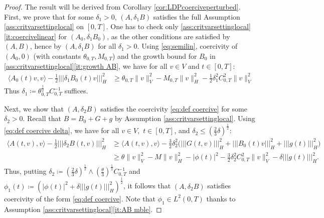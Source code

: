 \documentclass{amsart}
\newcommand{\<}{\langle}
\newcommand{\?}{\rangle}
\newcommand{\nn}{|\!|\!|}
\newcommand{\ceqq}{\coloneqq}
\theoremstyle{plain}
\theoremstyle{remark}
\theoremstyle{plain}
\numberwithin{equation}{section}
\begin{document}
\begin{proof} 
The result will be derived from Corollary \ref{cor:LDPcoerciveperturbed}. 
First, we prove that for some $\delta_1>0$, $(A,\delta_1 B)$ satisfies the full Assumption \ref{ass:critvarsettinglocal} on $[0,T]$. One has to check only \ref{ass:critvarsettinglocal}\ref{it:coercivelinear} for $(A_0,\delta_1 B_0)$, as the other conditions are satisfied by $(A,B)$, hence by $(A,\delta_1 B)$ for all $\delta_1>0$. Using \eqref{eq:semilin}, coercivity of $(A_0,0)$ (with constants $\theta_{0,T},M_{0,T}$) and the growth bound for $B_0$ in \ref{ass:critvarsettinglocal}\ref{it:growth AB}, we have for all $v\in V$ and $t\in[0,T]$:  
\begin{align*} 
\<A_0(t)v,v\?-\tfrac{1}{2}\nn \delta_1 B_0(t)v\nn_H^2 
&\geq  \theta_{0,T} \|v\|_V^2-M_{0,T} \|v\|_H^2-\tfrac{1}{2}\delta_1^2C_{0,T}^2\|v\|_V^2 
\end{align*} 
Thus $\delta_1\ceqq  \theta_{0,T}^{\frac12}C_{0,T}^{-1}$ suffices. 
  
Next, we show that $(A,\delta_2 B)$ satisfies the coercivity \eqref{eq:def coercive} for some $\delta_2>0$. Recall that $B=B_0+G+g$ by Assumption \ref{ass:critvarsettinglocal}. Using \eqref{eq:def coercive delta}, we have for all $v\in V,$ $t\in[0,T]$, and $\delta_2\leq (\frac23\delta)^{\frac12}$:
\begin{align*} 
   \<A(t,v),v\?-\tfrac{1}{2}\nn \delta_2 B (t,v) \nn_H^2 
  &\geq \<A(t,v),v\?-\tfrac32\delta_2^2\big(\nn  G (t,v) \nn_H^2+ \nn B_0 (t)v\nn_H^2+\nn g(t)\nn_H^2 \big) \\ 
  &\geq \theta \|v\|_V^2-M \|v\|_H^2-|{\phi}(t)|^2-\tfrac32\delta_2^2C_{0,T}^2\|v\|_V^2 -\delta \nn g(t)\nn_H^2. 
\end{align*} 
Thus, putting $\delta_2\ceqq (\frac23\delta)^{\frac12}\wedge (\frac{\theta}{3})^{\frac12}C_{0,T}^{-1}$ and ${\phi}_1(t)\ceqq  (|{\phi}(t)|^2 +\delta \nn g(t)\nn_H^2)^{\frac12}$, it follows that $(A,\delta_2 B)$ satisfies coercivity of the form \eqref{eq:def coercive}. Note that ${\phi}_1\in L^2(0,T)$ thanks to Assumption \ref{ass:critvarsettinglocal}\ref{it:AB mble}. 
  

\end{proof}
\end{document}
